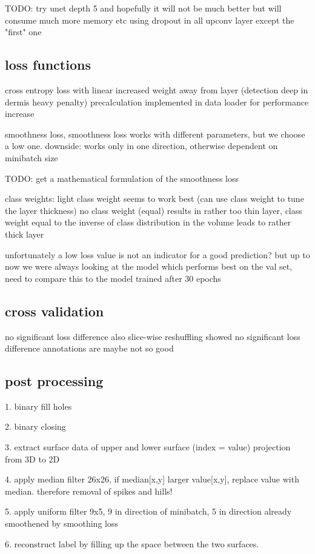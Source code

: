 \documentclass[a4paper,11pt,english,german]{book}
\begin{document}
TODO: try unet depth 5 and hopefully it will not be much better but will consume much more memory etc
using dropout in all upconv layer except the "first" one

\subsection{loss functions}
cross entropy loss with linear increased weight away from layer (detection deep in dermis heavy penalty)
precalculation implemented in data loader for performance increase

smoothness loss, smoothness loss works with different parameters, but we choose a low one.
downside: works only in one direction, otherwise dependent on minibatch size

TODO: get a mathematical formulation of the smoothness loss

class weights: light class weight seems to work best (can use class weight to tune the layer thickness)
no class weight (equal) results in rather too thin layer, class weight equal to the inverse of class distribution in the volume leads to rather thick layer

unfortunately a low loss value is not an indicator for a good prediction? but up to now we were always looking at the model
which performs best on the val set, need to compare this to the model trained after 30 epochs

\subsection{cross validation}
no significant loss difference
also slice-wise reshuffling showed no significant loss difference
annotations are maybe not so good

\subsection{post processing}
1. binary fill holes

2. binary closing

3. extract surface data of upper and lower surface (index = value) projection from 3D to 2D

4. apply median filter 26x26, if median[x,y] larger value[x,y], replace value with median. therefore removal of spikes and hills!

5. apply uniform filter 9x5, 9 in direction of minibatch, 5 in direction already smoothened by smoothing loss

6. reconstruct label by filling up the space between the two surfaces.
\end{document}
